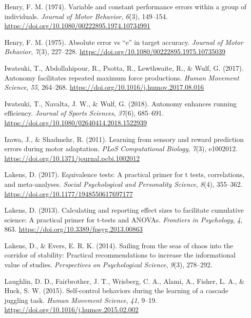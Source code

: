 \documentclass[
  man, donotrepeattitle,floatsintext]{apa7}
\newlength{\cslhangindent}
\newlength{\cslentryspacingunit} %
\newenvironment{CSLReferences}[2] %
 {%
  \setlength{\parindent}{0pt}
  \ifodd #1
  \let\oldpar\par
  \def\par{\hangindent=\cslhangindent\oldpar}
  \fi
  \setlength{\parskip}{#2\cslentryspacingunit}
 }%
 {}
\begin{document}
\begin{CSLReferences}{1}{0}
\leavevmode{}%
Henry, F. M. (1974). Variable and constant performance errors within a group of individuals. \emph{Journal of Motor Behavior}, \emph{6}(3), 149--154. \url{https://doi.org/10.1080/00222895.1974.10734991}

\leavevmode{}%
Henry, F. M. (1975). Absolute error vs {``e''} in target accuracy. \emph{Journal of Motor Behavior}, \emph{7}(3), 227--228. \url{https://doi.org/10.1080/00222895.1975.10735039}

\leavevmode{}%
Iwatsuki, T., Abdollahipour, R., Psotta, R., Lewthwaite, R., \& Wulf, G. (2017). Autonomy facilitates repeated maximum force productions. \emph{Human Movement Science}, \emph{55}, 264--268. \url{https://doi.org/10.1016/j.humov.2017.08.016}

\leavevmode{}%
Iwatsuki, T., Navalta, J. W., \& Wulf, G. (2018). Autonomy enhances running efficiency. \emph{Journal of Sports Sciences}, \emph{37}(6), 685--691. \url{https://doi.org/10.1080/02640414.2018.1522939}

\leavevmode{}%
Izawa, J., \& Shadmehr, R. (2011). Learning from sensory and reward prediction errors during motor adaptation. \emph{PLoS Computational Biology}, \emph{7}(3), e1002012. \url{https://doi.org/10.1371/journal.pcbi.1002012}

\leavevmode{}%
Lakens, D. (2017). Equivalence tests: {A} practical primer for t tests, correlations, and meta-analyses. \emph{Social Psychological and Personality Science}, \emph{8}(4), 355--362. \url{https://doi.org/10.1177/1948550617697177}

\leavevmode{}%
Lakens, D. (2013). Calculating and reporting effect sizes to facilitate cumulative science: A practical primer for t-tests and {ANOVAs}. \emph{Frontiers in Psychology}, \emph{4}, 863. \url{https://doi.org/10.3389/fpsyg.2013.00863}

\leavevmode{}%
Lakens, D., \& Evers, E. R. K. (2014). Sailing from the seas of chaos into the corridor of stability: Practical recommendations to increase the informational value of studies. \emph{Perspectives on Psychological Science}, \emph{9}(3), 278--292.

\leavevmode{}%
Laughlin, D. D., Fairbrother, J. T., Wrisberg, C. A., Alami, A., Fisher, L. A., \& Huck, S. W. (2015). Self-control behaviors during the learning of a cascade juggling task. \emph{Human Movement Science}, \emph{41}, 9--19. \url{https://doi.org/10.1016/j.humov.2015.02.002}


\end{CSLReferences}
\end{document}
